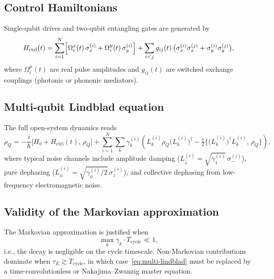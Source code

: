 \subsection{Control Hamiltonians}

Single-qubit drives and two-qubit entangling gates are generated by
\begin{equation}\label{eq:H-ctrl}
  H_{\mathrm{ctrl}}(t) = \sum_{i=1}^{N}
    \Bigl[
      \Omega_i^x(t)\,\sigma_x^{(i)} + \Omega_i^y(t)\,\sigma_y^{(i)}
    \Bigr]
  + \sum_{i < j} g_{ij}(t)\,\bigl(\sigma_x^{(i)}\sigma_x^{(j)}
                                   + \sigma_y^{(i)}\sigma_y^{(j)}\bigr),
\end{equation}
where $\Omega_i^\mu(t)$ are real pulse amplitudes and $g_{ij}(t)$ are
switched exchange couplings (photonic or phononic mediators).

\subsection{Multi-qubit Lindblad equation}

The full open-system dynamics reads
\begin{equation}\label{eq:multi-lindblad}
  \dot{\rho}_Q
  = -\frac{i}{\hbar}\bigl[H_0 + H_{\mathrm{ctrl}}(t),\,\rho_Q\bigr]
  + \sum_{i=1}^{N}\sum_{k} \gamma_k^{(i)}
      \!\left(
        L_k^{(i)} \rho_Q \bigl(L_k^{(i)}\bigr)^\dagger
        - \tfrac{1}{2}
          \bigl\{\bigl(L_k^{(i)}\bigr)^\dagger L_k^{(i)},\, \rho_Q\bigr\}
      \right),
\end{equation}
where typical noise channels include amplitude damping
($L_{\downarrow}^{(i)} = \sqrt{\gamma_1^{(i)}}\,\sigma_-^{(i)}$),
pure dephasing ($L_{\phi}^{(i)} = \sqrt{\gamma_\phi^{(i)}/2}\,\sigma_z^{(i)}$),
and collective dephasing from low-frequency electromagnetic noise.

\subsection{Validity of the Markovian approximation}

The Markovian approximation is justified when
\begin{equation}\label{eq:markov-cond}
  \max_k \gamma_k \cdot T_{\mathrm{cycle}} \ll 1,
\end{equation}
i.e., the decay is negligible on the cycle timescale.  Non-Markovian
contributions dominate when $\tau_E \gtrsim T_{\mathrm{cycle}}$, in
which case~\eqref{eq:multi-lindblad} must be replaced by a
time-convolutionless or Nakajima--Zwanzig master equation.


